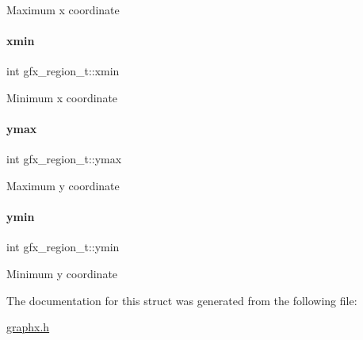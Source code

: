 Maximum x coordinate \mbox{\label{structgfx__region__t_aca46800ecb570cb10cdb5ef93b65f32b}} 
\paragraph{\texorpdfstring{xmin}{xmin}}
{\footnotesize\ttfamily int gfx\+\_\+region\+\_\+t\+::xmin}

Minimum x coordinate \mbox{\label{structgfx__region__t_aeef728b14af6648346d4b2aa5d438268}} 
\paragraph{\texorpdfstring{ymax}{ymax}}
{\footnotesize\ttfamily int gfx\+\_\+region\+\_\+t\+::ymax}

Maximum y coordinate \mbox{\label{structgfx__region__t_a1dcbb75f8713584c7c8808618075ad48}} 
\paragraph{\texorpdfstring{ymin}{ymin}}
{\footnotesize\ttfamily int gfx\+\_\+region\+\_\+t\+::ymin}

Minimum y coordinate 

The documentation for this struct was generated from the following file\+:\begin{DoxyCompactItemize}
\item 
\hyperlink{graphx_8h}{graphx.\+h}\end{DoxyCompactItemize}
